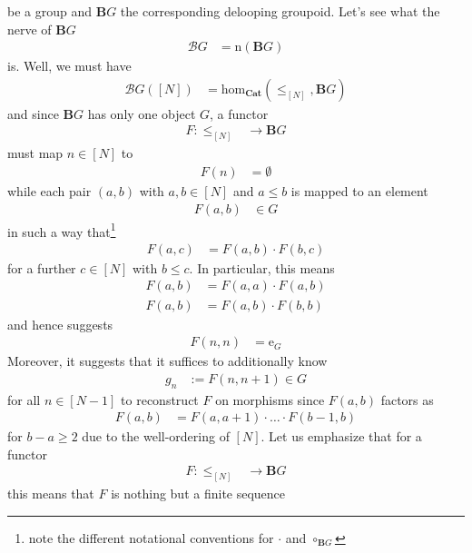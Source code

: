 be a group and $\mathbf{B}G$ the corresponding delooping groupoid.
Let's see what the nerve of $\mathbf{B}G$
\begin{align*}
  \mathcal{B}G
  &=
  \mathrm{n}(\mathbf{B}G)
\end{align*}
is.
Well, we must have
\begin{align*}
  \mathcal{B}G
  \left(
    [N]
  \right)
  &=
  \mathrm{hom}_{\mathbf{Cat}}
  \left(
    \pmb{\leq}_{[N]},
    \mathbf{B}G
  \right)
\end{align*}
and since $\mathbf{B}G$ has only one object $G$, a functor
\begin{align*}
  F
  \colon
  \pmb{\leq}_{[N]}
  &\rightarrow
  \mathbf{B}G
\end{align*}
must map $n \in [N]$ to
\begin{align*}
  F(n)
  &=
  \emptyset
\end{align*}
while each pair $(a,b)$ with $a,b \in [N]$ and $a \leq b$ is mapped to an element
\begin{align*}
  F(a,b)
  &\in
  G
\end{align*}
in such a way that\footnote{note the different notational conventions for $\cdot$ and $\circ_{\mathbf{B}G}$}
\begin{align*}
  F(a,c)
  &=
  F(a,b)
  \cdot
  F(b,c)
\end{align*}
for a further $c \in [N]$ with $b \leq c$.
In particular, this means
\begin{align*}
  F(a,b)
  &=
  F(a,a)
  \cdot
  F(a,b)
  \\
  F(a,b)
  &=
  F(a,b)
  \cdot
  F(b,b)
\end{align*}
and hence suggests
\begin{align*}
  F(n,n)
  &=
  \mathrm{e}_{G}
\end{align*}
Moreover, it suggests that it suffices to additionally know
\begin{align*}
  g_{n}
  &:=
  F(n,n + 1)
  \in 
  G
\end{align*}
for all $n \in [N - 1]$ to reconstruct $F$ on morphisms since $F(a,b)$ factors as
\begin{align*}
  F(a,b)
  &=
  F(a,a + 1)
  \cdot
  \ldots
  \cdot
  F(b - 1,b)
\end{align*}
for $b - a \geq 2$ due to the well-ordering of $[N]$.
Let us emphasize that for a functor
\begin{align*}
  F
  \colon
  \pmb{\leq}_{[N]}
  &\rightarrow
  \mathbf{B}G
\end{align*}
this means that $F$ is nothing but a finite sequence
